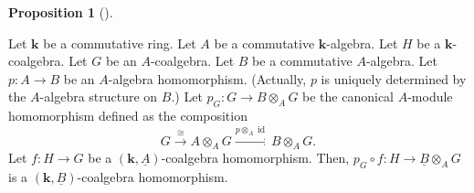 \documentclass
[numbers=enddot,12pt,final,onecolumn,notitlepage,abstracton]{scrartcl}%
\theoremstyle{definition}
\newtheorem{prop}[theo]{Proposition}
\newenvironment{proposition}[1][]
{\begin{prop}[#1]\begin{leftbar}}
{\end{leftbar}\end{prop}}
\begin{document}
\begin{proposition}
\label{prop.relative.composition.c1}Let $\mathbf{k}$ be a commutative ring.
Let $A$ be a commutative $\mathbf{k}$-algebra. Let $H$ be a $\mathbf{k}%
$-coalgebra. Let $G$ be an $A$-coalgebra. Let $B$ be a commutative
$A$-algebra. Let $p:A\rightarrow B$ be an $A$-algebra homomorphism. (Actually,
$p$ is uniquely determined by the $A$-algebra structure on $B$.) Let
$p_{G}:G\rightarrow B\otimes_{A}G$ be the canonical $A$-module homomorphism
defined as the composition%
\[
G\overset{\cong}{\longrightarrow}A\otimes_{A}G\overset{p\otimes_{A}%
\operatorname*{id}}{\longrightarrow}B\otimes_{A}G.
\]
Let $f:H\rightarrow G$ be a $\left(  \mathbf{k},\underline{A}\right)
$-coalgebra homomorphism. Then, $p_{G}\circ f:H\rightarrow\underline{B}%
\otimes_{A}G$ is a $\left(  \mathbf{k},\underline{B}\right)  $-coalgebra homomorphism.
\end{proposition}
\end{document}
